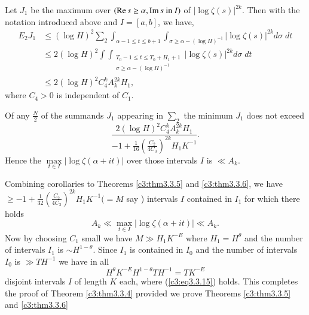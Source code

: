 \begin{theorem}\label{c3:thm3.3.6}
Let $J_1$ be the maximum over $(\operatorname{Re} s \geq \alpha,\operatorname{Im} s \text{ in } I)$ of $|\log \zeta(s)|^{2k}$. Then with the notation introduced above and $I = [a,b]$, we have,
\begin{align*}
E_2 J_1 & \leq (\log H)^2 \sum_2 \int_{\alpha -1 \leq t \leq b+1} \int_{\sigma \geq \alpha - (\log H)^{-1}} |\log \zeta(s)|^{2k} d \sigma \; dt\\
& \leq 2 (\log H)^2 \int\int_{\substack{T_0 - 1 \leq t \leq T_0 + H_1 +1\\ \sigma \geq \alpha - (\log H)^{-1}}} |\log \zeta(s)|^{2k} d \sigma \; dt\\
& \leq 2 (\log H)^2 C^k_4 A^{2k}_k H_1, \tag{3.3.13}\label{c3:eq3.3.13}
\end{align*}
where $C_4 > 0$ is independent of $C_1$. 
\end{theorem}

\begin{coro*}
Of any $\frac{N}{2}$ of the summands $J_1$ appearing in $\sum_2$ the minimum $J_1$ does not exceed
\begin{equation*}
\frac{2(\log H)^2 C^k_4 A^{2k}_k H_1}{-1 + \frac{1}{16} (\frac{C_2}{4C_3})^{2k} H_1 K^{-1}}. 
\tag{3.3.14}\label{c3:eq3.3.14}
\end{equation*}
Hence the $\max\limits_{t \in I} |\log \zeta(\alpha+ it)|$ over those intervals $I$ is $\ll A_k$.
 \end{coro*}

Combining corollaries to Theorems \ref{c3:thm3.3.5} and \ref{c3:thm3.3.6}, we have $\geq -1 + \frac{1}{32} (\frac{C_2}{4C_3})^{2k} H_1 K^{-1} (= M$ say ) intervals $I$ contained in $I_1$ for which there holds 
\begin{equation*}
A_k \ll \max\limits_{t \in I} |\log \zeta(\alpha + it)| \ll A_k. \tag{3.3.15}\label{c3:eq3.3.15}
\end{equation*}
Now by choosing $C_1$ small we have $M \gg H_1 K^{-E} $ where $H_1 = H^{\theta}$ and the number of intervals $I_1$ is $\sim H^{1-\theta}$. Since $I_1$ is contained in $I_0$ and the number of intervals $I_0$ is $\gg TH^{-1}$ we have in all 
\begin{equation*}
H^{\theta} K^{-E} H^{1-\theta} TH^{-1} = T K^{-E} \tag{3.3.16}\label{c3:eq3.3.16}
\end{equation*}\pageoriginale 
disjoint intervals $I$ of length $K$ each, where (\ref{c3:eq3.3.15}) holds. This completes the proof of Theorem \ref{c3:thm3.3.4} provided we prove Theorems \ref{c3:thm3.3.5} and \ref{c3:thm3.3.6}

